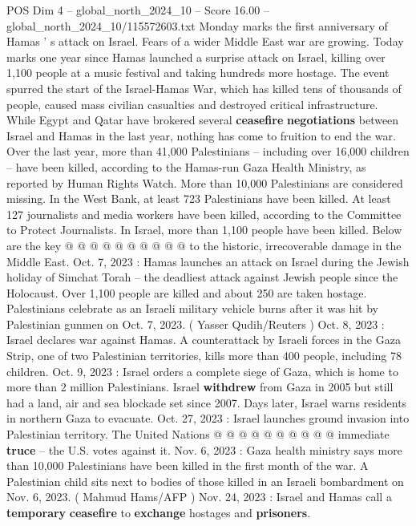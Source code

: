 \begin{textsample}{POS Dim 4 – global\_north\_2024\_10 – Score 16.00 – global\_north\_2024\_10/115572603.txt}  \label{ex:f4_pos_410}
Monday marks the first anniversary of Hamas ' s attack on Israel.
Fears of a wider Middle East war are growing.
Today marks one year since Hamas launched a surprise attack on Israel, killing over 1,100 people at a music festival and taking hundreds more hostage.
The event spurred the start of the Israel-Hamas War, which has killed tens of thousands of people, caused mass civilian casualties and destroyed critical infrastructure.
While Egypt and Qatar have brokered several \textbf{ceasefire} \textbf{negotiations} between Israel and Hamas in the last year, nothing has come to fruition to end the war.
Over the last year, more than 41,000 Palestinians -- including over 16,000 children -- have been killed, according to the Hamas-run Gaza Health Ministry, as reported by Human Rights Watch.
More than 10,000 Palestinians are considered missing.
In the West Bank, at least 723 Palestinians have been killed.
At least 127 journalists and media workers have been killed, according to the Committee to Protect Journalists.
In Israel, more than 1,100 people have been killed.
Below are the key @ @ @ @ @ @ @ @ @ @ to the historic, irrecoverable damage in the Middle East.
Oct. 7, 2023 : Hamas launches an attack on Israel during the Jewish holiday of Simchat Torah -- the deadliest attack against Jewish people since the Holocaust.
Over 1,100 people are killed and about 250 are taken hostage.
Palestinians celebrate as an Israeli military vehicle burns after it was hit by Palestinian gunmen on Oct. 7, 2023. ( Yasser Qudih/Reuters ) Oct. 8, 2023 : Israel declares war against Hamas.
A counterattack by Israeli forces in the Gaza Strip, one of two Palestinian territories, kills more than 400 people, including 78 children.
Oct. 9, 2023 : Israel orders a complete siege of Gaza, which is home to more than 2 million Palestinians.
Israel \textbf{withdrew} from Gaza in 2005 but still had a land, air and sea blockade set since 2007.
Days later, Israel warns residents in northern Gaza to evacuate.
Oct. 27, 2023 : Israel launches ground invasion into Palestinian territory.
The United Nations @ @ @ @ @ @ @ @ @ @ immediate \textbf{truce} -- the U.S. votes against it.
Nov. 6, 2023 : Gaza health ministry says more than 10,000 Palestinians have been killed in the first month of the war.
A Palestinian child sits next to bodies of those killed in an Israeli bombardment on Nov. 6, 2023. ( Mahmud Hams/AFP ) Nov. 24, 2023 : Israel and Hamas call a \textbf{temporary} \textbf{ceasefire} to \textbf{exchange} hostages and \textbf{prisoners}.

\end{textsample}
